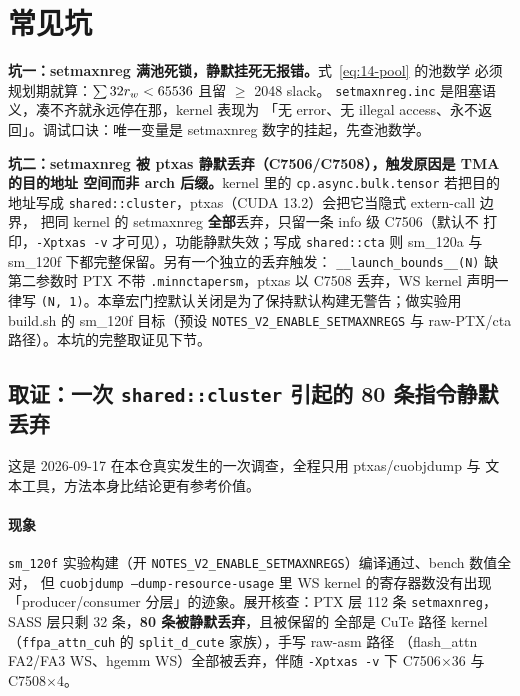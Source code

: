 \section{常见坑}

\textbf{坑一：setmaxnreg 满池死锁，静默挂死无报错。}式~\ref{eq:14-pool} 的池数学
必须规划期就算：$\sum 32 r\sb{w} < 65536$ 且留 $\ge$ 2048 slack。
\texttt{setmaxnreg.\allowbreak{}inc} 是阻塞语义，凑不齐就永远停在那，kernel 表现为
「无 error、无 illegal access、永不返回」。调试口诀：唯一变量是 setmaxnreg
数字的挂起，先查池数学。

\textbf{坑二：setmaxnreg 被 ptxas 静默丢弃（C7506/C7508），触发原因是 TMA 的目的地址
空间而非 arch 后缀。}\allowbreak{}kernel 里的
\texttt{cp.\allowbreak{}async.\allowbreak{}bulk.\allowbreak{}tensor} 若把目的地址写成
\texttt{shared::cluster}，ptxas（CUDA 13.2）会把它当隐式 extern-call 边界，
把同 kernel 的 setmaxnreg \textbf{全部}丢弃，只留一条 info 级 C7506（默认不
打印，\texttt{-Xptxas -v} 才可见），功能静默失效；写成 \texttt{shared::cta}
则 sm\_120a 与 sm\_120f 下都完整保留。另有一个独立的丢弃触发：
\texttt{\_\allowbreak{}\_\allowbreak{}launch\_\allowbreak{}bounds\_\allowbreak{}\_\allowbreak{}(N)} 缺第二参数时 PTX 不带
\texttt{.minnctapersm}，ptxas 以 C7508 丢弃，WS kernel 声明一律写
\texttt{(N, 1)}。本章宏门控默认关闭是为了保持默认构建无警告；做实验用
build.sh 的 sm\_120f 目标（预设 \texttt{NOTES\_\allowbreak{}V2\_\allowbreak{}ENABLE\_\allowbreak{}SETMAXNREGS}
与 raw-PTX/cta 路径）。本坑的完整取证见下节。

\subsection*{取证：一次 \texttt{shared::cluster} 引起的 80 条指令静默丢弃}

这是 2026-09-17 在本仓真实发生的一次调查，全程只用 ptxas/cuobjdump 与
文本工具，方法本身比结论更有参考价值。

\paragraph{现象} \texttt{sm\_120f} 实验构建（开
\texttt{NOTES\_\allowbreak{}V2\_\allowbreak{}ENABLE\_\allowbreak{}SETMAXNREGS}）编译通过、bench 数值全对，
但 \texttt{cuobjdump --dump-resource-usage} 里 WS kernel 的寄存器数没有出现
「producer/consumer 分层」的迹象。展开核查：PTX 层 112 条
\texttt{setmaxnreg}，SASS 层只剩 32 条，\textbf{80 条被静默丢弃}，且被保留的
全部是 CuTe 路径 kernel（\texttt{ffpa\_\allowbreak{}attn\_\allowbreak{}cuh} 的
\texttt{split\_\allowbreak{}d\_\allowbreak{}cute} 家族），手写 raw-asm 路径
（flash\_attn FA2/FA3 WS、hgemm WS）全部被丢弃，伴随
\texttt{-Xptxas -v} 下 C7506$\times$36 与 C7508$\times$4。

